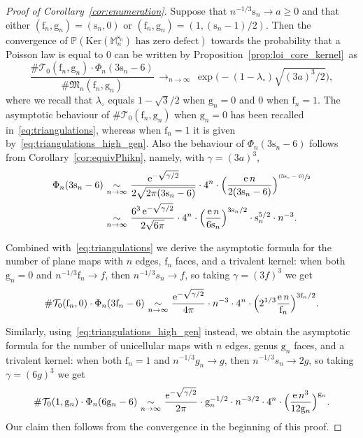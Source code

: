 \documentclass[JEP,XML,SOM,Unicode,NoFloatCountersInSection,NoEqCountersInSection]{cedram}
\newcommand{\psfrac}[2]{\sfrac{(#1)}{#2}}
\theoremstyle{plain}
\theoremstyle{definition}
\theoremstyle{remark}
\newcommand{\e}{\operatorname{e}}
\newcommand{\Mapb}{\mathbb{M}}
\newcommand{\face}{\mathrm{f}}
\newcommand{\gen}{\mathrm{g}}
\newcommand{\spar}{\mathrm{s}}
\newcommand{\cv}[1][n]{\,\mathop{\longrightarrow}^{}_{#1 \to \infty}\,}
\newcommand{\equi}[1][n]{\,\mathop{\sim}^{}_{#1 \to \infty}\,}
\begin{document}
\begin{proof}[Proof of Corollary~\ref{cor:enumeration}]
Suppose that $n^{-1/3} \spar_n \!\to\! a \!\ge\! 0$ and that either $(\face_n, \gen_n) \!=\! (\spar_n, 0)$ or $(\face_n, \gen_n) \!=\! (1, (\spar_n-1)/2)$. Then the convergence of $\mathbb{P}(\mathrm{Ker}(\Mapb_{n}^{\spar_{n}}) \mbox{ has zero defect})$ towards the probability that a Poisson law is equal to $0$ can be written by Proposition~\ref{prop:loi_core_kernel}~as
\[
\frac{\# \mathcal{T}_0(\face_n,\gen_n) \cdot \Phi_{n}(3\spar_n-6 )}{\# \mathfrak{M}_n(\face_n,\gen_n)}
\cv \exp\bigl(- (1-\lambda_{\circ}) \sqrt{(3a)^3 / 2}\bigr),
\]
where we recall that $\lambda_\circ$ equals $1 - \sqrt{3}/2$ when $\gen_n=0$ and $0$ when $\face_n=1$.
The asymptotic behaviour of $\# \mathcal{T}_0(\face_n,\gen_n)$ when $\gen_n=0$ has been recalled in~\eqref{eq:triangulations}, whereas when $\face_n=1$ it is given by~\eqref{eq:triangulations_high_gen}. Also the behaviour of $\Phi_{n}(3\spar_n-6 )$ follows from Corollary~\ref{cor:equivPhikn}, namely, with $\gamma = (3a)^3$,\vspace*{-3pt}
\begin{align*}
\Phi_{n}(3 \spar_{n}-6)
& \equi \frac{\e^{- \sqrt{\gamma/2}}}{2\sqrt{2 \pi (3\spar_{n}-6)}} \cdot 4^{n} \cdot \Bigl(\frac{\e n}{2 (3\spar_{n}-6)}\Bigr)^{ \psfrac{3\spar_{n}-6}{2}}
\\
& \equi \frac{6^3 \e^{- \sqrt{\gamma/2}}}{2\sqrt{6 \pi}} \cdot 4^{n} \cdot \Bigl(\frac{\e n}{6 \spar_{n}}\Bigr)^{3\spar_{n}/2} \cdot \spar_{n}^{5/2} \cdot n^{-3}.
\end{align*}

Combined with~\eqref{eq:triangulations} we derive the asymptotic formula for the number of plane maps with $n$ edges, $\face_n$ faces, and a trivalent kernel: when both $\gen_n=0$ and $n^{-1/3} \face_n \to f$, then $n^{-1/3} s_{n} \rightarrow f$, so taking $\gamma=(3f)^{3}$ we get
\[
\#\mathcal{T}_0(\face_n,0) \cdot \Phi_{n}(3 \face_{n}-6)
\equi \frac{\e^{- \sqrt{\gamma/2}}}{4 \pi} \cdot n^{-3} \cdot 4^{n} \cdot \Bigl(2^{1/3} \frac{\e n}{\face_{n}}\Bigr)^{3\face_{n}/2}.
\]

Similarly, using~\eqref{eq:triangulations_high_gen} instead, we obtain the asymptotic formula for the number of unicellular maps with $n$ edges, genus $\gen_n$ faces, and a trivalent kernel: when both $\face_n=1$ and $n^{-1/3} g_{n} \rightarrow g$, then $n^{-1/3} s_{n} \rightarrow 2g$, so taking $\gamma=(6g)^{3}$ we get
\[
\#\mathcal{T}_0(1,\gen_n) \cdot \Phi_{n}(6 \gen_{n}-6)
\equi \frac{ \e^{- \sqrt{\gamma/2}}}{2\pi } \cdot \gen_n^{-1/2} \cdot n^{-3/2} \cdot 4^{n} \cdot \Bigl(\frac{\e n^3}{12 \gen_n}\Bigr)^{\gen_n}.
\]
Our claim then follows from the convergence in the beginning of this proof.
\end{proof}
\end{document}
